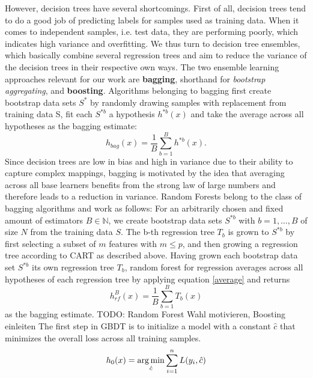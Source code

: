 However, decision trees have several shortcomings. First of all, decision trees tend to do a good job of predicting labels for samples used as training data. When it comes to independent samples, i.e. test data, they are performing poorly, which indicates high variance and overfitting. We thus turn to  decision tree ensembles, which basically combine several regression trees and aim to reduce the variance of the decision trees in their respective own ways. 
The two ensemble learning approaches relevant for our work are \textbf{bagging}, shorthand for \textit{bootstrap aggregating}, and \textbf{boosting}. 
Algorithms belonging to bagging first create bootstrap data sets $ S^{*} $ by randomly drawing samples with replacement from training data S, fit each $ S^{*b} $ a hypothesis $ h^{*b}(x) $ and take the average across all hypotheses as the bagging estimate: 
\begin{equation}\label{average}
	h_{bag}(x) = \dfrac{1}{B} \sum_{b=1}^{B} h^{*b}(x).
\end{equation}
Since decision trees are low in bias and high in variance due to their ability to capture complex mappings, bagging is motivated by the idea that averaging across all base learners benefits from the strong law of large numbers and therefore leads to a reduction in variance. 
Random Forests belong to the class of bagging algorithms and work as follows:
For an arbitrarily chosen and fixed amount of estimators $ B \in \mathbb{N}$, we create bootstrap data sets $ S^{*b} $ with $ b = 1, \dots, B $ of size $ N $ from the training data $ S $. The b-th regression tree $ T_b $ is grown to $ S^{*b} $ by first selecting a subset of $ m $ features with $ m \leq p $, and then growing a regression tree according to CART as described above.
Having grown each bootstrap data set $ S^{*b} $ its own regression tree $ T_b $, random forest for regression averages across all hypotheses of each regression tree by applying equation \ref{average} and returns
\begin{equation}
h^{B}_{rf}(x) = \dfrac{1}{B} \sum_{b=1}^{B} T_b(x)
\end{equation}
as the bagging estimate.
\newline
\newline
TODO: Random Forest Wahl motivieren, Boosting einleiten
\newline
\newline
The first step in GBDT is to initialize a model with a constant $ \hat{c} $ that minimizes the overall loss across all training samples.
\begin{equation}
h_{0}(x) =  \operatorname*{arg\,min}_{\hat{c}} \sum_{i=1}^n L(y_i,\hat{c}) \label{gbdt_step1}
\end{equation}
